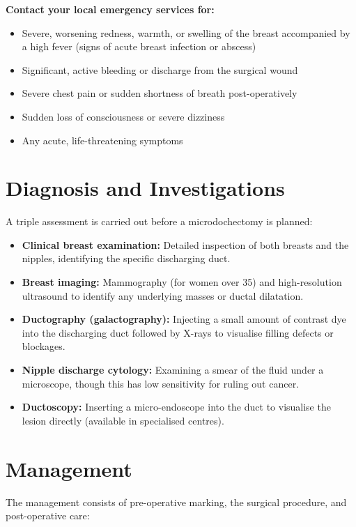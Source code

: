 \textbf{Contact your local emergency services for:}
\begin{itemize}
    \item Severe, worsening redness, warmth, or swelling of the breast accompanied by a high fever (signs of acute breast infection or abscess)
    \item Significant, active bleeding or discharge from the surgical wound
    \item Severe chest pain or sudden shortness of breath post-operatively
    \item Sudden loss of consciousness or severe dizziness
    \item Any acute, life-threatening symptoms
\end{itemize}

\section*{Diagnosis and Investigations}
A triple assessment is carried out before a microdochectomy is planned:

\begin{itemize}
    \item \textbf{Clinical breast examination:} Detailed inspection of both breasts and the nipples, identifying the specific discharging duct.
    \item \textbf{Breast imaging:} Mammography (for women over 35) and high-resolution ultrasound to identify any underlying masses or ductal dilatation.
    \item \textbf{Ductography (galactography):} Injecting a small amount of contrast dye into the discharging duct followed by X-rays to visualise filling defects or blockages.
    \item \textbf{Nipple discharge cytology:} Examining a smear of the fluid under a microscope, though this has low sensitivity for ruling out cancer.
    \item \textbf{Ductoscopy:} Inserting a micro-endoscope into the duct to visualise the lesion directly (available in specialised centres).
\end{itemize}

\section*{Management}
The management consists of pre-operative marking, the surgical procedure, and post-operative care:

